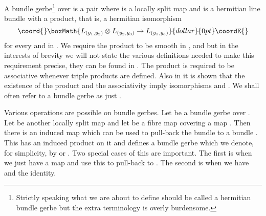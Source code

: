 \documentclass[a4paper,reqno]{amsart}
\theoremstyle{plain}
\theoremstyle{definition}
\theoremstyle{remark}
\numberwithin{equation}{section}
\numberwithin{figure}{section}
\providecommand{\CC}{{\mathbb C}}
\providecommand{\<}{\langle}
\renewcommand{\>}{\rangle}
\begin{document}
A bundle gerbe\footnote{Strictly speaking what we are about to define
should be called a hermitian  bundle gerbe but the extra terminology is
overly burdensome.} over \coordHE{} is a pair \coordHE{} where
\coordHE{} is a locally split map and
\coordHE{} is a hermitian line bundle \coordHE{} with a product, that is,
a hermitian  isomorphism
$$\coord{}\boxMath{
L_{(y_1, y_2)} \otimes L_{(y_2, y_3)} \to L_{(y_1, y_3)}
}{dollar}{0pt}\coordE{}$$
for every \coordHE{} and \coordHE{} in \coordHE{}.
We require the product to be smooth in \coordHE{}, \coordHE{} and
\coordHE{} but in the interests of brevity we will not state the various
definitions needed to make this requirement precise, they  can be found in
\cite{Mur}.
The product is required to be
associative whenever triple products are defined. Also in \cite{Mur}
it is shown that the existence of the product and the associativity
imply isomorphisms \myHighlight{$L_{(y, y)} \simeq \CC$}\coordHE{} and \coordHE{}. We shall
often refer to a bundle gerbe \coordHE{} as just \coordHE{}.

Various operations are possible on bundle gerbes.  Let \coordHE{}
be a bundle gerbe over \coordHE{}.
Let \coordHE{} be another locally split map
and let  \coordHE{} be a fibre map covering
a map \coordHE{}.  Then there is an induced map
\coordHE{} which can
          be used to pull-back the bundle \coordHE{} to a bundle
\coordHE{}.  This has an induced product on it
and defines a bundle gerbe which we denote, for simplicity,
by \coordHE{} or \coordHE{}.  Two special cases
of this are important. The first is when we just have a map
          \coordHE{} and use this to pull-back \coordHE{} to
\coordHE{}. The second is when we have \coordHE{} and
\myHighlight{$\phi$}\coordHE{} the identity.
\end{document}
